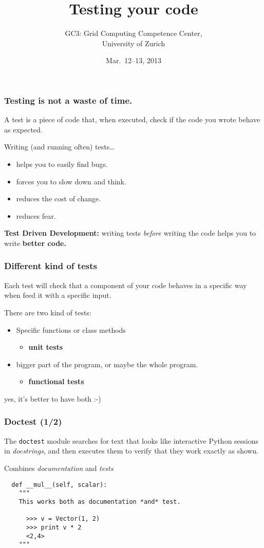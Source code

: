 \documentclass[english,serif,mathserif,xcolor=pdftex,dvipsnames,table]{beamer}
\title[Testing]{%
  Testing your code
}
\author[GC3]{%
  GC3: Grid Computing Competence Center, \\
  University of Zurich
}
\date{Mar.~12--13, 2013}
\begin{document}
\maketitle


\begin{frame}
  \frametitle{Testing is \textbf{not} a waste of time.}
  A test is a piece of code that, when executed, check if the code you
  wrote behave as expected.

  \+
  Writing (and running often) tests\ldots
  \begin{itemize}
  \item helps you to easily find bugs.
  \item forces you to slow down and think.
  \item reduces the cost of change.
  \item reduces fear.
  \end{itemize}

  \+ \textbf{Test Driven Development:} writing tests \textit{before}
  writing the code helps you to write \textbf{better code.}
\end{frame}


\begin{frame}
  \frametitle{Different kind of tests} 

  Each test will check that a component of your code behaves in a
  specific way when feed it with a specific input.

  \+
  There are two kind of tests:
  \begin{itemize}
  \item Specific functions or class methods
    \begin{itemize}
    \item \textbf{unit tests}
    \end{itemize}
  \item bigger part of the program, or maybe the whole program.
    \begin{itemize}
    \item \textbf{functional tests}
    \end{itemize}
  \end{itemize}

  \+
  \pause
  yes, it's better to have both :-)
\end{frame}


\begin{frame}[fragile]
  \frametitle{Doctest (1/2)}

  The \lstinline|doctest| module searches for text that looks like
  interactive Python sessions in \textit{docstrings}, and then
  executes them to verify that they work exactly as shown.

  \+
  Combines \textit{documentation} and \textit{tests}
  \begin{lstlisting}
  def __mul__(self, scalar):
    """
    This works both as documentation *and* test.

      >>> v = Vector(1, 2)
      >>> print v * 2
      <2,4>
    """
  \end{lstlisting}
\end{frame}
\end{document}
